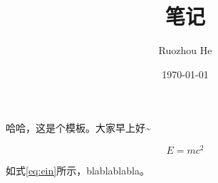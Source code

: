 \documentclass[a4paper,punct,fancyhdr]{ctexart}
\title{笔记}
\author{Ruozhou He}
\date{\today}
\begin{document}
    \maketitle
	
    哈哈，这是个模板。大家早上好\textasciitilde

    \begin{equation}
        E=mc^2
        \label{eq:ein}
    \end{equation}
    
    如式\ref{eq:ein}所示，blablablabla。
\end{document}
